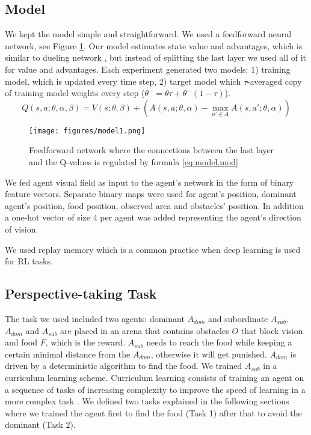 \documentclass{article}
\begin{document}
\subsection{Model}\label{model}
We kept the model simple and straightforward. We used a feedforward neural network, see Figure \ref{fig.model}. Our model estimates state value and advantages, which is similar to dueling network \cite{DBLP:journals/corr/WangFL15}, but instead of splitting the last layer we used all of it for value and advantages. Each experiment generated two models: 1) training model, which is updated every time step, 2) target model which $\tau$-averaged copy of training model weights every step (\(\theta^{-} = \theta \tau + \theta^{-} (1-\tau)\)).
  \begin{equation} \label{eq:model.mod}
    Q(s,a;\theta,\alpha,\beta) = V(s;\theta,\beta) +\left( A(s,a;\theta,\alpha) - \underset{a' \in A}{\max}A(s,a';\theta,\alpha) \right)
  \end{equation}
\begin{figure}[!ht]
\begin{center}
\texttt{[image: figures/model1.png]}
\caption{Feedforward network where the connections between the last layer and the Q-values is regulated by formula \ref{eq:model.mod}}
\label{fig.model}
\end{center}
\end{figure}

 \par We fed \label{network.input} agent visual field as input to the agent's network in the form of binary feature vectors. Separate binary maps were used for agent's position, dominant agent's position, food position, observed area and obstacles' position. In addition a one-hot vector of size 4 per agent was added representing the agent's direction of vision.

\par We used replay memory which is a common practice when deep learning is used for RL tasks\cite{mnih2015human}.

\subsection{Perspective-taking Task}
The task we used included two agents: dominant $A_{dom}$ and subordinate $A_{sub}$. $A_{dom}$ and $A_{sub}$ are placed in an arena that contains obstacles $O$ that block vision and food $F$, which is the reward. $A_{sub}$ needs to reach the food while keeping a certain minimal distance from the $A_{dom}$, otherwise it will get punished. $A_{dom}$ is driven by a deterministic algorithm to find the food. 
We trained $A_{sub}$ in a curriculum learning scheme.
Curriculum learning consists of training an agent on a sequence of tasks of increasing complexity to improve the speed of learning in a more complex task \cite{narvekar2016curriculum}. We defined two tasks explained in the following sections where we trained the agent first to find the food (Task 1) after that to avoid the dominant (Task 2).
\end{document}
